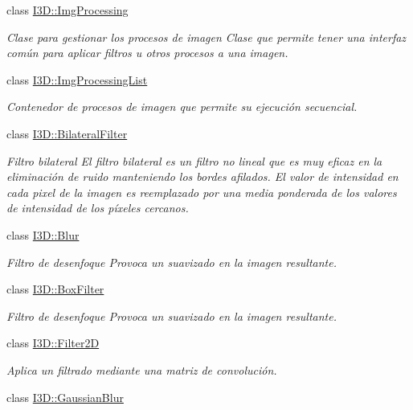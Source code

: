 \begin{DoxyCompactItemize}
\item 
class \hyperlink{class_i3_d_1_1_img_processing}{I3\+D\+::\+Img\+Processing}
\begin{DoxyCompactList}\small\item\em Clase para gestionar los procesos de imagen Clase que permite tener una interfaz común para aplicar filtros u otros procesos a una imagen. \end{DoxyCompactList}\item 
class \hyperlink{class_i3_d_1_1_img_processing_list}{I3\+D\+::\+Img\+Processing\+List}
\begin{DoxyCompactList}\small\item\em Contenedor de procesos de imagen que permite su ejecución secuencial. \end{DoxyCompactList}\item 
class \hyperlink{class_i3_d_1_1_bilateral_filter}{I3\+D\+::\+Bilateral\+Filter}
\begin{DoxyCompactList}\small\item\em Filtro bilateral El filtro bilateral es un filtro no lineal que es muy eficaz en la eliminación de ruido manteniendo los bordes afilados. El valor de intensidad en cada pixel de la imagen es reemplazado por una media ponderada de los valores de intensidad de los píxeles cercanos. \end{DoxyCompactList}\item 
class \hyperlink{class_i3_d_1_1_blur}{I3\+D\+::\+Blur}
\begin{DoxyCompactList}\small\item\em Filtro de desenfoque Provoca un suavizado en la imagen resultante. \end{DoxyCompactList}\item 
class \hyperlink{class_i3_d_1_1_box_filter}{I3\+D\+::\+Box\+Filter}
\begin{DoxyCompactList}\small\item\em Filtro de desenfoque Provoca un suavizado en la imagen resultante. \end{DoxyCompactList}\item 
class \hyperlink{class_i3_d_1_1_filter2_d}{I3\+D\+::\+Filter2D}
\begin{DoxyCompactList}\small\item\em Aplica un filtrado mediante una matriz de convolución. \end{DoxyCompactList}\item 
class \hyperlink{class_i3_d_1_1_gaussian_blur}{I3\+D\+::\+Gaussian\+Blur}

\end{DoxyCompactItemize}
